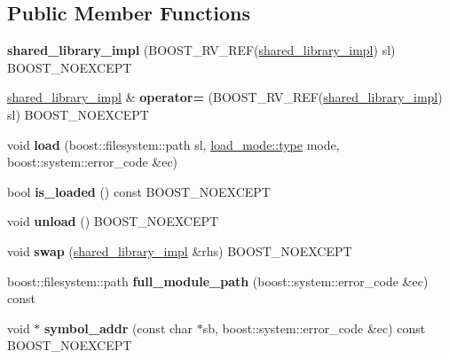 \subsection*{Public Member Functions}
\begin{DoxyCompactItemize}
\item 
{\bfseries shared\+\_\+library\+\_\+impl} (B\+O\+O\+S\+T\+\_\+\+R\+V\+\_\+\+R\+EF(\hyperlink{a00272}{shared\+\_\+library\+\_\+impl}) sl) B\+O\+O\+S\+T\+\_\+\+N\+O\+E\+X\+C\+E\+PT\hypertarget{a00272_a45d5bb26fa73a9639618bab3e343f114}{}\label{a00272_a45d5bb26fa73a9639618bab3e343f114}

\item 
\hyperlink{a00272}{shared\+\_\+library\+\_\+impl} \& {\bfseries operator=} (B\+O\+O\+S\+T\+\_\+\+R\+V\+\_\+\+R\+EF(\hyperlink{a00272}{shared\+\_\+library\+\_\+impl}) sl) B\+O\+O\+S\+T\+\_\+\+N\+O\+E\+X\+C\+E\+PT\hypertarget{a00272_a4516d0b76678a60333cb5ccbf7cc52c2}{}\label{a00272_a4516d0b76678a60333cb5ccbf7cc52c2}

\item 
void {\bfseries load} (boost\+::filesystem\+::path sl, \hyperlink{a00729_a1918a602801479bc0bade54ff5665129}{load\+\_\+mode\+::type} mode, boost\+::system\+::error\+\_\+code \&ec)\hypertarget{a00272_a2c3bbcf10638f5fdeb13b1f194431ac5}{}\label{a00272_a2c3bbcf10638f5fdeb13b1f194431ac5}

\item 
bool {\bfseries is\+\_\+loaded} () const B\+O\+O\+S\+T\+\_\+\+N\+O\+E\+X\+C\+E\+PT\hypertarget{a00272_a3729718e9c72b30a85087a89b642becb}{}\label{a00272_a3729718e9c72b30a85087a89b642becb}

\item 
void {\bfseries unload} () B\+O\+O\+S\+T\+\_\+\+N\+O\+E\+X\+C\+E\+PT\hypertarget{a00272_a78b3736f4aab0a61fd07a45eb5a54c52}{}\label{a00272_a78b3736f4aab0a61fd07a45eb5a54c52}

\item 
void {\bfseries swap} (\hyperlink{a00272}{shared\+\_\+library\+\_\+impl} \&rhs) B\+O\+O\+S\+T\+\_\+\+N\+O\+E\+X\+C\+E\+PT\hypertarget{a00272_a7d87e32878fd68cd3c59531c5b6dcaf1}{}\label{a00272_a7d87e32878fd68cd3c59531c5b6dcaf1}

\item 
boost\+::filesystem\+::path {\bfseries full\+\_\+module\+\_\+path} (boost\+::system\+::error\+\_\+code \&ec) const \hypertarget{a00272_a67a07a86c8455bf7c5cde77d69e5f994}{}\label{a00272_a67a07a86c8455bf7c5cde77d69e5f994}

\item 
void $\ast$ {\bfseries symbol\+\_\+addr} (const char $\ast$sb, boost\+::system\+::error\+\_\+code \&ec) const B\+O\+O\+S\+T\+\_\+\+N\+O\+E\+X\+C\+E\+PT\hypertarget{a00272_a79bc56fc8e9c4fb98993893b491986a8}{}\label{a00272_a79bc56fc8e9c4fb98993893b491986a8}


\end{DoxyCompactItemize}
